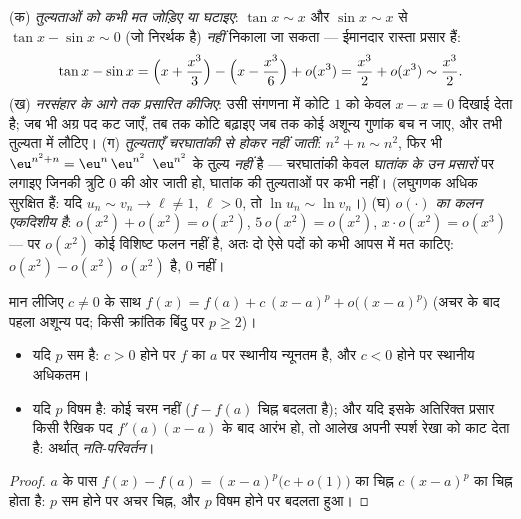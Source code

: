 \begin{remark}[प्रसारों की सामान्य भूलें]
(क) \emph{तुल्यताओं को कभी मत जोड़िए या घटाइए}: $\tan x \sim x$ और $\sin x
\sim x$ से $\tan x - \sin x \sim 0$ (जो निरर्थक है) \emph{नहीं} निकाला जा
सकता --- ईमानदार रास्ता प्रसार हैं:
\[
\tan x - \sin x
= \Bigl(x + \frac{x^3}{3}\Bigr) - \Bigl(x - \frac{x^3}{6}\Bigr)
+ o(x^3) = \frac{x^3}{2} + o(x^3) \sim \frac{x^3}{2} .
\]
(ख) \emph{नरसंहार के आगे तक प्रसारित कीजिए}: उसी संगणना में कोटि $1$ को केवल
$x - x = 0$ दिखाई देता है; जब भी अग्र पद कट जाएँ, तब तक कोटि बढ़ाइए जब तक
कोई अशून्य गुणांक बच न जाए, और तभी तुल्यता में लौटिए। (ग) \emph{तुल्यताएँ
चरघातांकी से होकर नहीं जातीं}: $n^2 + n \sim n^2$, फिर भी $\eu^{n^2+n} =
\eu^{n}\,\eu^{n^2}$ $\eu^{n^2}$ के तुल्य \emph{नहीं} है --- चरघातांकी केवल
\emph{घातांक के उन प्रसारों} पर लगाइए जिनकी त्रुटि $0$ की ओर जाती हो, घातांक
की तुल्यताओं पर कभी नहीं। (लघुगणक अधिक सुरक्षित हैं: यदि $u_n \sim v_n \to
\ell \neq 1$, $\ell > 0$, तो $\ln u_n \sim \ln v_n$।) (घ) \emph{$o(\cdot)$
का कलन एकदिशीय है}: $o(x^2) + o(x^2) = o(x^2)$, $5\,o(x^2) = o(x^2)$,
$x\cdot o(x^2) = o(x^3)$ --- पर $o(x^2)$ कोई विशिष्ट फलन नहीं है, अतः दो ऐसे
पदों को कभी आपस में मत काटिए: $o(x^2) - o(x^2)$ $o(x^2)$ है, $0$ नहीं।
\end{remark}

\begin{proposition}[स्थानीय व्यवहार]\label{prop:b1:taylor:local}
मान लीजिए $c \neq 0$ के साथ $f(x) = f(a) + c\,(x - a)^p +
o\bigl((x-a)^p\bigr)$ (अचर के बाद पहला अशून्य पद; किसी क्रांतिक बिंदु पर $p
\geq 2$)।
\begin{itemize}
  \item यदि $p$ सम है: $c > 0$ होने पर $f$ का $a$ पर स्थानीय न्यूनतम है, और
  $c < 0$ होने पर स्थानीय अधिकतम।
  \item यदि $p$ विषम है: कोई चरम नहीं ($f - f(a)$ चिह्न बदलता है); और यदि
  इसके अतिरिक्त प्रसार किसी रैखिक पद $f'(a)(x - a)$ के बाद आरंभ हो, तो आलेख
  अपनी स्पर्श रेखा को काट देता है: अर्थात् \emph{नति-परिवर्तन}।
\end{itemize}
\end{proposition}

\begin{proof}
$a$ के पास $f(x) - f(a) = (x-a)^p\bigl(c + o(1)\bigr)$ का चिह्न $c\,(x-a)^p$
का चिह्न होता है: $p$ सम होने पर अचर चिह्न, और $p$ विषम होने पर बदलता हुआ।
\end{proof}

